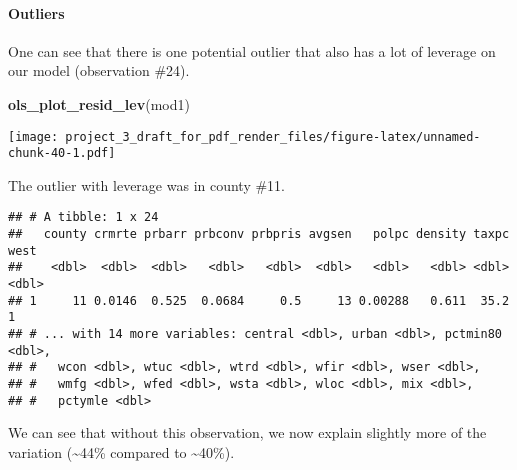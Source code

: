 \documentclass[]{article}
\newenvironment{Shaded}{\begin{snugshade}}{\end{snugshade}}
\newcommand{\DataTypeTok}[1]{\textcolor[rgb]{0.13,0.29,0.53}{#1}}
\newcommand{\DecValTok}[1]{\textcolor[rgb]{0.00,0.00,0.81}{#1}}
\newcommand{\KeywordTok}[1]{\textcolor[rgb]{0.13,0.29,0.53}{\textbf{#1}}}
\newcommand{\NormalTok}[1]{#1}
\newcommand{\OperatorTok}[1]{\textcolor[rgb]{0.81,0.36,0.00}{\textbf{#1}}}
\newcommand{\StringTok}[1]{\textcolor[rgb]{0.31,0.60,0.02}{#1}}
\let\oldparagraph\paragraph
\renewcommand{\paragraph}[1]{\oldparagraph{#1}\mbox{}}
\begin{document}
\hypertarget{outliers}{%
\paragraph{Outliers}\label{outliers}}

One can see that there is one potential outlier that also has a lot of
leverage on our model (observation \#24).

\begin{Shaded}
\begin{Highlighting}[]
\KeywordTok{ols_plot_resid_lev}\NormalTok{(mod1)}
\end{Highlighting}
\end{Shaded}

\texttt{[image: project\_3\_draft\_for\_pdf\_render\_files/figure-latex/unnamed-chunk-40-1.pdf]}

The outlier with leverage was in county \#11.

\begin{Shaded}
\end{Shaded}

\begin{verbatim}
## # A tibble: 1 x 24
##   county crmrte prbarr prbconv prbpris avgsen   polpc density taxpc  west
##    <dbl>  <dbl>  <dbl>   <dbl>   <dbl>  <dbl>   <dbl>   <dbl> <dbl> <dbl>
## 1     11 0.0146  0.525  0.0684     0.5     13 0.00288   0.611  35.2     1
## # ... with 14 more variables: central <dbl>, urban <dbl>, pctmin80 <dbl>,
## #   wcon <dbl>, wtuc <dbl>, wtrd <dbl>, wfir <dbl>, wser <dbl>,
## #   wmfg <dbl>, wfed <dbl>, wsta <dbl>, wloc <dbl>, mix <dbl>,
## #   pctymle <dbl>
\end{verbatim}

We can see that without this observation, we now explain slightly more
of the variation (\textasciitilde{}44\% compared to
\textasciitilde{}40\%).

\begin{Shaded}
\end{Shaded}
\end{document}
